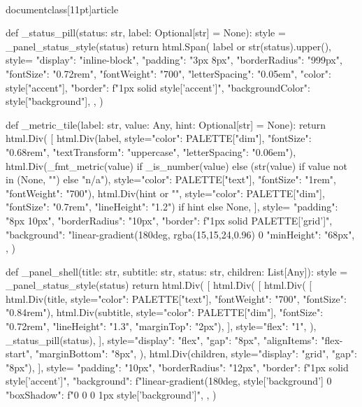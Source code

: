 \\documentclass[11pt]{article}
\begin{document}
\begin{CodeBlock}
{def _status_pill(status: str, label: Optional[str] = None):
    style = _panel_status_style(status)
    return html.Span(
        label or str(status).upper(),
        style={
            "display": "inline-block",
            "padding": "3px 8px",
            "borderRadius": "999px",
            "fontSize": "0.72rem",
            "fontWeight": "700",
            "letterSpacing": "0.05em",
            "color": style["accent"],
            "border": f"1px solid {style['accent']}",
            "backgroundColor": style["background"],
        },
    )


def _metric_tile(label: str, value: Any, hint: Optional[str] = None):
    return html.Div(
        [
            html.Div(label, style={"color": PALETTE["dim"], "fontSize": "0.68rem", "textTransform": "uppercase", "letterSpacing": "0.06em"}),
            html.Div(_fmt_metric(value) if _is_number(value) else (str(value) if value not in (None, "") else "n/a"), style={"color": PALETTE["text"], "fontSize": "1rem", "fontWeight": "700"}),
            html.Div(hint or "", style={"color": PALETTE["dim"], "fontSize": "0.7rem", "lineHeight": "1.2"}) if hint else None,
        ],
        style={
            "padding": "8px 10px",
            "borderRadius": "10px",
            "border": f"1px solid {PALETTE['grid']}",
            "background": "linear-gradient(180deg, rgba(15,15,24,0.96) 0%
            "minHeight": "68px",
        },
    )


def _panel_shell(title: str, subtitle: str, status: str, children: List[Any]):
    style = _panel_status_style(status)
    return html.Div(
        [
            html.Div(
                [
                    html.Div(
                        [
                            html.Div(title, style={"color": PALETTE["text"], "fontWeight": "700", "fontSize": "0.84rem"}),
                            html.Div(subtitle, style={"color": PALETTE["dim"], "fontSize": "0.72rem", "lineHeight": "1.3", "marginTop": "2px"}),
                        ],
                        style={"flex": "1"},
                    ),
                    _status_pill(status),
                ],
                style={"display": "flex", "gap": "8px", "alignItems": "flex-start", "marginBottom": "8px"},
            ),
            html.Div(children, style={"display": "grid", "gap": "8px"}),
        ],
        style={
            "padding": "10px",
            "borderRadius": "12px",
            "border": f"1px solid {style['accent']}",
            "background": f"linear-gradient(180deg, {style['background']} 0%
            "boxShadow": f"0 0 0 1px {style['background']}",
        },
    )


}
\end{CodeBlock}
\end{document}
